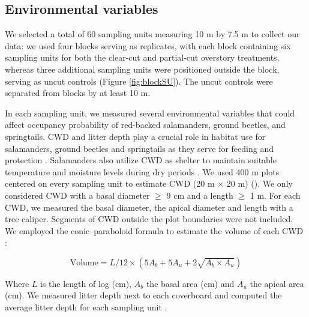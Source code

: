 \subsection*{Environmental variables}
\label{subsec:EnvVar}

We selected a total of 60 sampling units measuring 10 m by 7.5 m to collect our data: we used four blocks serving as replicates, 
with each block containing six sampling units for both the clear-cut and partial-cut overstory treatments, 
whereas three additional sampling units were positioned outside the block, serving as uncut controls (Figure \ref*{fig:blockSU}). 
The uncut controls were separated from blocks by at least 10 m. 

In each sampling unit, we measured several environmental variables that could affect occupancy probability of red-backed salamanders, ground beetles, and springtails.
CWD and litter depth play a crucial role in habitat use for salamanders, ground beetles and springtails as
they serve for feeding and protection  \citep{harmonEcologyCoarseWoody1986,koivula.LeafLitterSmallscale1999,birdChangesSoilLitter2004,mckennyEffectsStructuralComplexity2006}. 
Salamanders also utilize CWD as shelter to maintain suitable temperature and moisture levels during dry periods \citep{Jaeger1980MicrohabitatsTerrestrial,groverInfluenceCoverMoisture1998a,patrickEffectsExperimentalForestry2006a}.
We used 400 m plots centered on every sampling unit to estimate CWD (20 m $\times$  20 m) (\citealp{methotGuideInventaireEchantillonnage2014}). 
We only considered CWD with a basal diameter $\geq$ 9 cm and a length $\geq$ 1 m.
For each CWD, we measured the basal diameter, the apical diameter and length with a tree caliper.
Segments of CWD outside the plot boundaries were not included.
We employed the conic–paraboloid formula to estimate the volume of each CWD \citep{fraverRefiningVolumeEstimates2007} :

\begin{equation}
  \text{Volume} = L/12 \times (5A_b + 5A_u + 2\sqrt{A_b \times A_u})
\end{equation}

\vspace{0.5cm}

Where $L$ is the length of log (cm), $A_b$ the basal area (cm) and $A_u$ the apical area (cm).
We measured litter depth next to each coverboard and computed the average litter depth for each sampling unit \citep{Mazerolle2021Woodlandsalamander}. \\

